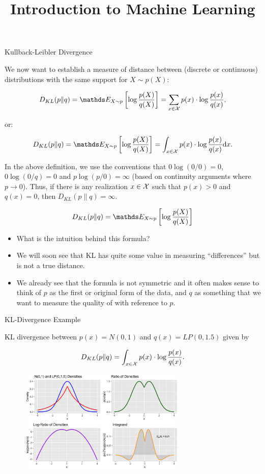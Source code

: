 \documentclass[11pt,compress,t,notes=noshow, xcolor=table]{beamer}
\title{Introduction to Machine Learning}
\date{}
\begin{document}


\begin{vbframe} {Kullback-Leibler Divergence}

We now want to establish a measure of distance between (discrete or continuous) distributions with the same support for $X \sim p(X)$:

  $$ D_{KL}(p \| q) = \E_{X \sim p} \left[\log \frac{p(X)}{q(X)}\right] = \sum_{x \in \Xspace} p(x) \cdot \log \frac{p(x)}{q(x)}, $$
  
  or: 
  
  $$ D_{KL}(p \| q) = \E_{X \sim p} \left[\log \frac{p(X)}{q(X)}\right] = \int_{x \in \Xspace} p(x) \cdot \log \frac{p(x)}{q(x)} \mathrm{d}x. $$

In the above definition, we use the conventions that $0 \log (0/0) = 0$, $0 \log (0/q) = 0$ and $p \log(p/0) = \infty$ (based on continuity arguments where $p \to 0$). 
Thus, if there is any realization $x \in \mathcal{X}$ such that $p(x) > 0$ and $q(x) = 0$,
then $D_{KL}(p \| q) = \infty.$
  
\framebreak

$$ D_{KL}(p \| q) = \E_{X \sim p} \left[\log \frac{p(X)}{q(X)}\right] $$

\begin{itemize}
  \item  What is the intuition behind this formula?  
  \item  We will soon see that KL has quite some value in measuring \enquote{differences} but is not a true distance. 
  \item  We already see that the formula is not symmetric and it often makes sense to think of $p$ as the first or original form of the data,
    and $q$ as something that we want to measure the quality of with reference to $p$.
  \end{itemize}

\end{vbframe}

\begin{vbframe} {KL-Divergence Example}

KL divergence between $p(x)=N(0,1)$ and $q(x)=LP(0, 1.5)$ given by

  $$ D_{KL}(p \| q) = \int_{x \in \mathcal{X}} p(x) \cdot \log \frac{p(x)}{q(x)}. $$

\begin{figure}
\includegraphics[width = 8cm ]{figure/kl_calculation_plot_1.png} 
\end{figure}

\end{vbframe}
\end{document}
